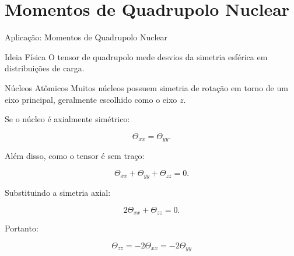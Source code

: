 \documentclass[aspectratio=169]{beamer}
\begin{document}
\section{Momentos de Quadrupolo Nuclear}

\begin{frame}{Aplicação: Momentos de Quadrupolo Nuclear}

\begin{mybox}{Ideia Física}
O tensor de quadrupolo mede desvios da simetria esférica
em distribuições de carga.
\end{mybox}

\vspace{0.3cm}

\begin{alertblock}{Núcleos Atômicos}
Muitos núcleos possuem simetria de rotação em torno de um eixo principal,
geralmente escolhido como o eixo \(z\).
\end{alertblock}

\end{frame}

\begin{frame}

Se o núcleo é axialmente simétrico:

\[
\Theta_{xx}=\Theta_{yy}.
\]

Além disso, como o tensor é sem traço:

\[
\Theta_{xx}+\Theta_{yy}+\Theta_{zz}=0.
\]

Substituindo a simetria axial:

\[
2\Theta_{xx}+\Theta_{zz}=0.
\]

Portanto:

\begin{eqbox}
\begin{equation}
\Theta_{zz}
=
-2\Theta_{xx}
=
-2\Theta_{yy}
\tag{4.70}
\end{equation}
\end{eqbox}

\end{frame}
\end{document}
